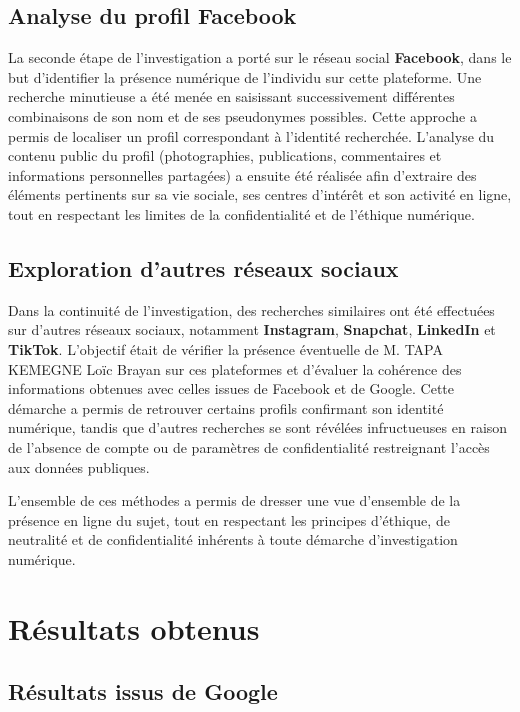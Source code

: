 \documentclass[12pt, a4em]{article}
\begin{document}
	\subsection{Analyse du profil Facebook}
	
	La seconde étape de l’investigation a porté sur le réseau social \textbf{Facebook}, dans le but d’identifier la présence numérique de l’individu sur cette plateforme. 
	Une recherche minutieuse a été menée en saisissant successivement différentes combinaisons de son nom et de ses pseudonymes possibles. 
	Cette approche a permis de localiser un profil correspondant à l’identité recherchée. 
	L’analyse du contenu public du profil (photographies, publications, commentaires et informations personnelles partagées) a ensuite été réalisée afin d’extraire des éléments pertinents sur sa vie sociale, ses centres d’intérêt et son activité en ligne, tout en respectant les limites de la confidentialité et de l’éthique numérique.
	
	\subsection{Exploration d’autres réseaux sociaux}
	
	Dans la continuité de l’investigation, des recherches similaires ont été effectuées sur d’autres réseaux sociaux, notamment \textbf{Instagram}, \textbf{Snapchat}, \textbf{LinkedIn} et \textbf{TikTok}. 
	L’objectif était de vérifier la présence éventuelle de M. TAPA KEMEGNE Loïc Brayan sur ces plateformes et d’évaluer la cohérence des informations obtenues avec celles issues de Facebook et de Google. 
	Cette démarche a permis de retrouver certains profils confirmant son identité numérique, tandis que d’autres recherches se sont révélées infructueuses en raison de l’absence de compte ou de paramètres de confidentialité restreignant l’accès aux données publiques.
	
	L’ensemble de ces méthodes a permis de dresser une vue d’ensemble de la présence en ligne du sujet, tout en respectant les principes d’éthique, de neutralité et de confidentialité inhérents à toute démarche d’investigation numérique.
	
	
	\section{Résultats obtenus}
	
	\subsection{Résultats issus de Google}
	
\end{document}
